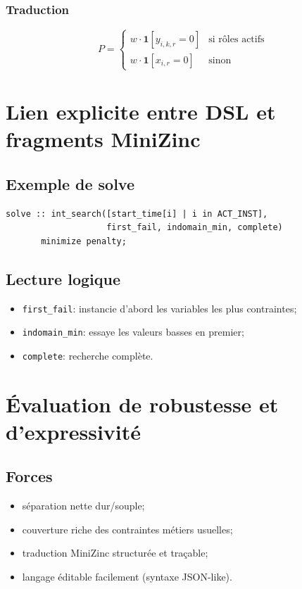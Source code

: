 \documentclass[12pt,a4paper]{article}
\begin{document}
\subsubsection*{Traduction}
\[
P=
\begin{cases}
w\cdot \mathbf{1}[y_{i,k,r}=0] & \text{si rôles actifs}\\
w\cdot \mathbf{1}[x_{i,r}=0] & \text{sinon}
\end{cases}
\]

\section{Lien explicite entre DSL et fragments MiniZinc}
\subsection{Exemple de solve}
\begin{lstlisting}
solve :: int_search([start_time[i] | i in ACT_INST],
                    first_fail, indomain_min, complete)
       minimize penalty;
\end{lstlisting}

\subsection{Lecture logique}
\begin{itemize}
  \item \texttt{first\_fail}: instancie d'abord les variables les plus contraintes;
  \item \texttt{indomain\_min}: essaye les valeurs basses en premier;
  \item \texttt{complete}: recherche complète.
\end{itemize}

\section{Évaluation de robustesse et d'expressivité}
\subsection{Forces}
\begin{itemize}
  \item séparation nette dur/souple;
  \item couverture riche des contraintes métiers usuelles;
  \item traduction MiniZinc structurée et traçable;
  \item langage éditable facilement (syntaxe JSON-like).
\end{itemize}
\end{document}
